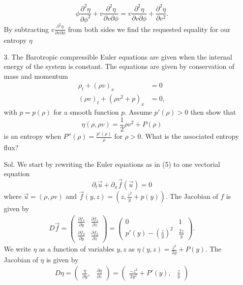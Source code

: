 \documentclass[]{report}
\begin{document}
\begin{itemize}
	\[\phi \frac{\partial^2 \eta}{\partial \phi^2}	+ v  \frac{\partial^2 \eta}{\partial v \partial \phi} =  v  \frac{\partial^2 \eta}{\partial v \partial \phi} + \frac{\partial^2 \eta}{\partial v^2}.\]
	By subtracting $v  \frac{\partial^2 \eta}{\partial v \partial \phi}$ from both sides we find the requested equality for our entropy $\eta$
	\newpage
	\item[3.]The Barotropic compressible Euler equations are given when the internal energy
	of the system is constant. The equations are given by conservation of mass and momentum
	\begin{equation}
	\begin{split}
		\rho_t +(\rho v)_x &= 0\\
		(\rho v)_t + \left(\rho v^2 + p\right)_x &= 0,
	\end{split}
	\end{equation}
	with $p = p(\rho)$ for a smooth function $p$. Assume $p'(\rho)>0$ then show that
	\begin{equation}
	\eta(\rho,\rho v)= \frac12 \rho v^2 + P(\rho)
	\end{equation}
	is an entropy when $P''(\rho) = \frac{p'(\rho)}{\rho}$ for $\rho >0$. What is the associated entropy flux?
	\item[Sol.]We start by rewriting the Euler equations as in (5) to one vectorial equation
	\[\partial_t\vec{u}+\partial_x \vec{f}(\vec{u})=0\]
	where $\vec{u}=(\rho, \rho v)$ and $\vec{f}(y,z)=(z,\frac{z^2}{y}+p(y))$. 
	The Jacobian of $f$ is given by
	\begin{align*}
	D\vec{f}=\begin{pmatrix}
	\frac{\partial f_1}{\partial y}	& \frac{\partial f_1}{\partial z}\\
	\frac{\partial f_2}{\partial y}	& \frac{\partial f_2}{\partial z}\end{pmatrix}
	=\begin{pmatrix}
	0	& 1\\
	p'(y) - (\frac{z}{y})^2	& \frac{2z}{y}
	\end{pmatrix}.
	\end{align*}
	We write $\eta$ as a function of variables $y, z$ as $\eta(y,z)=\frac{z^2}{2y}+P(y)$. The Jacobian of $\eta$ is given by
	\begin{align*}
	D\eta=\begin{pmatrix}
	\frac{\eta}{\partial y}	,& \frac{\partial \eta}{\partial z}\end{pmatrix}
	=\begin{pmatrix}
	\frac{-z^2}{2y^2} + P'(y)	,& \frac{z}{y}

\end{pmatrix}
\end{align*}
\end{itemize}
\end{document}
